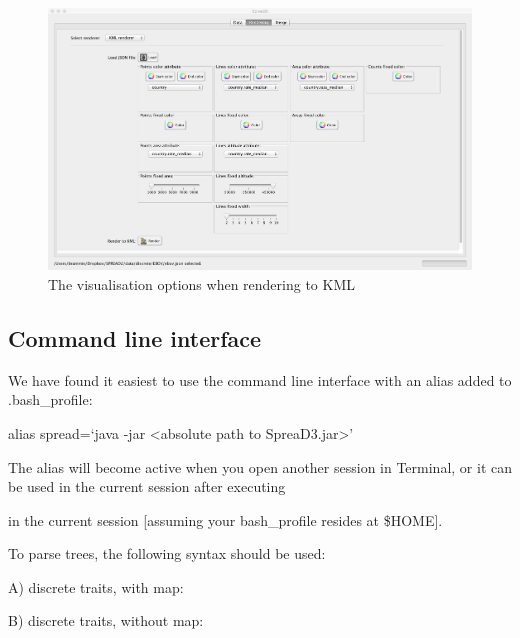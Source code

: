 \documentclass[english]{paper}
\newenvironment{lyxcode}
{\par\begin{list}{}{
\setlength{\rightmargin}{\leftmargin}
\setlength{\listparindent}{0pt}%
\raggedright
\setlength{\itemsep}{0pt}
\setlength{\parsep}{0pt}
\normalfont\ttfamily}%
 \item[]}
{\end{list}}
\def \spreadname {SpreaD3}
\begin{document}
\begin{figure}%
\centering
\includegraphics[width=1\textwidth]{./figures/kml_render.pdf} 
\caption{The visualisation options when rendering to KML}
\label{fig:KMLrender}
\end{figure}


\subsection{Command line interface\label{CLI}}

We have found it easiest to use the command line interface with an alias added to .bash\_profile:

\begin{lyxcode}
alias spread=`java -jar <absolute path to {\spreadname}.jar>' 
\end{lyxcode}

\noindent
The alias will become active when you open another session in Terminal, or it can be used in the current session after executing


\noindent
in the current session  [assuming your bash\_profile resides at \$HOME]. 

\vspace{.5cm}

To parse trees, the following syntax should be used:

A) discrete traits, with map:


B) discrete traits, without map:
\end{document}
